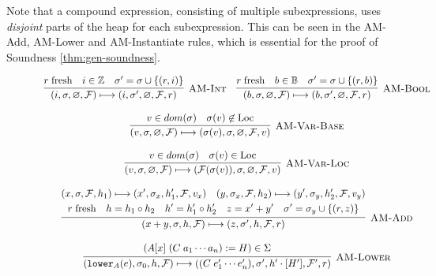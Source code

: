 \noindent
Note that a compound expression, consisting of multiple
subexpressions, uses \emph{disjoint} parts of the heap for each
subexpression. This can be seen in the {\sc AM-Add}, {\sc AM-Lower}
and {\sc AM-Instantiate} rules, which is essential for the proof of
Soundness \autoref{thm:gen-soundness}.

\begin{figure}
{
\[
\begin{array}{c}
  \labinfer[AM-Int]{(i, \sigma, \emptyheap, \mathcal{F}) \step (i, \sigma', \emptyheap, \mathcal{F}, r) }
    {\freshVar{r} & i \in \mathbb{Z} & \sigma' = \sigma \cup \{ (r, i) \}}
  ~~~
  \labinfer[AM-Bool]{(b, \sigma, \emptyheap, \mathcal{F}) \step (b, \sigma', \emptyheap, \mathcal{F}, r) }
    {\freshVar{r} & b \in \mathbb{B} & \sigma' = \sigma \cup \{ (r, b) \}}
  \\\\
  \labinfer[AM-Var-Base]{(v, \sigma, \emptyheap, \mathcal{F}) \step (\sigma(v), \sigma, \emptyheap, \mathcal{F}, v)}
    {v \in dom(\sigma) & \sigma(v) \not\in \Loc}
  \\\\
  \labinfer[AM-Var-Loc]{(v, \sigma, \emptyheap, \mathcal{F}) \step (\mathcal{F}(\sigma(v)), \sigma, \emptyheap, \mathcal{F}, v)}
    {v \in dom(\sigma) & \sigma(v) \in \Loc}
  \\\\
  \labinfer[AM-Add]{(x + y, \sigma, h, \mathcal{F}) \step (z, \sigma', h, \mathcal{F}, r)}
    {\begin{gathered}
      (x, \sigma, \mathcal{F}, h_1) \step (x', \sigma_x, h_1', \mathcal{F}, v_x)
      ~~~ (y, \sigma_x, \mathcal{F}, h_2) \step (y', \sigma_y, h_2', \mathcal{F}, v_y)
    \\  \freshVar{r}
    ~~~ h = h_1 \circ h_2
    ~~~ h' = h_1' \circ h_2'
    ~~~ z = x' + y'
    ~~~ \sigma' = \sigma_y \cup \{ (r, z) \}
     \end{gathered}
    }
  \\\\
  \labinfer[AM-Lower]{(\lowerS{A}{e}, \sigma_0, h, \mathcal{F}) \step ((C\; e_1' \cdots e_n'), \sigma', h' \cdot [H'], \mathcal{F}', r)}
     {\begin{gathered}
          (A[x]\; (C\; a_1 \cdots a_n) := H) \in \Sigma

\end{gathered}}
\end{array}\]}
\end{figure}
